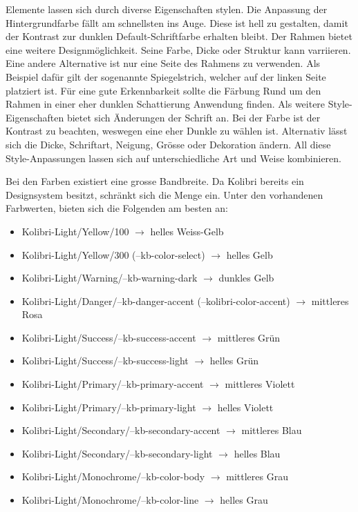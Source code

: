 Elemente lassen sich durch diverse Eigenschaften stylen.
Die Anpassung der Hintergrundfarbe fällt am schnellsten ins Auge.
Diese ist hell zu gestalten, damit der Kontrast zur dunklen Default-Schriftfarbe erhalten bleibt.
Der Rahmen bietet eine weitere Designmöglichkeit. 
Seine Farbe, Dicke oder Struktur kann varriieren. 
Eine andere Alternative ist nur eine Seite des Rahmens zu verwenden. 
Als Beispiel dafür gilt der sogenannte Spiegelstrich, welcher auf der linken Seite platziert ist.
Für eine gute Erkennbarkeit sollte die Färbung Rund um den Rahmen in einer eher dunklen Schattierung Anwendung finden.
Als weitere Style-Eigenschaften bietet sich Änderungen der Schrift an.
Bei der Farbe ist der Kontrast zu beachten, weswegen eine eher Dunkle zu wählen ist.
Alternativ lässt sich die Dicke, Schriftart, Neigung, Grösse oder Dekoration ändern.
All diese Style-Anpassungen lassen sich auf unterschiedliche Art und Weise kombinieren.

Bei den Farben existiert eine grosse Bandbreite.
Da Kolibri bereits ein Designsystem besitzt, schränkt sich die Menge ein.
Unter den vorhandenen Farbwerten, bieten sich die Folgenden am besten an:

\begin{itemize}
    \item Kolibri-Light/Yellow/100 $\rightarrow$ helles Weiss-Gelb
    \item Kolibri-Light/Yellow/300 (--kb-color-select) $\rightarrow$ helles Gelb
    \item Kolibri-Light/Warning/--kb-warning-dark $\rightarrow$ dunkles Gelb
    \item Kolibri-Light/Danger/--kb-danger-accent (--kolibri-color-accent) $\rightarrow$ mittleres Rosa
    \item Kolibri-Light/Success/--kb-success-accent $\rightarrow$ mittleres Grün
    \item Kolibri-Light/Success/--kb-success-light $\rightarrow$ helles Grün
    \item Kolibri-Light/Primary/--kb-primary-accent $\rightarrow$ mittleres Violett
    \item Kolibri-Light/Primary/--kb-primary-light $\rightarrow$ helles Violett
    \item Kolibri-Light/Secondary/--kb-secondary-accent $\rightarrow$ mittleres Blau
    \item Kolibri-Light/Secondary/--kb-secondary-light $\rightarrow$ helles Blau
    \item Kolibri-Light/Monochrome/--kb-color-body $\rightarrow$ mittleres Grau
    \item Kolibri-Light/Monochrome/--kb-color-line $\rightarrow$ helles Grau
\end{itemize}

